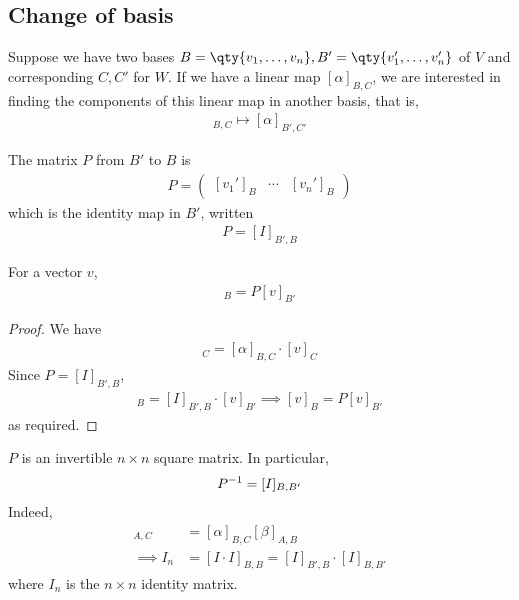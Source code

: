 \subsection{Change of basis}
Suppose we have two bases $B = \qty{v_1, \dots, v_n}, B' = \qty{v_1', \dots, v_n'}$ of $V$ and corresponding $C, C'$ for $W$.
If we have a linear map $[\alpha]_{B,C}$, we are interested in finding the components of this linear map in another basis, that is,
\begin{align*}
    [\alpha]_{B,C} \mapsto [\alpha]_{B',C'}
\end{align*}
\begin{definition}
    The  matrix $P$ from $B'$ to $B$ is
    \begin{align*}
        P = \begin{pmatrix}
            [v_1']_B & \cdots & [v_n']_B
        \end{pmatrix}
    \end{align*}
    which is the identity map in $B'$, written
    \begin{align*}
        P = [I]_{B', B}
    \end{align*}
\end{definition}
\begin{lemma}
    For a vector $v$,
    \begin{align*}
        [v]_B = P [v]_{B'}
    \end{align*}
\end{lemma}
\begin{proof}
    We have
    \begin{align*}
        [\alpha(v)]_C = [\alpha]_{B,C} \cdot [v]_C
    \end{align*}
    Since $P = [I]_{B', B}$,
    \begin{align*}
        [I(v)]_B = [I]_{B', B} \cdot [v]_{B'} \implies [v]_B = P[v]_{B'}
    \end{align*}
    as required.
\end{proof}
\begin{remark}
    $P$ is an invertible $n \times n$ square matrix.
    In particular,
    \begin{align*}
        P^{-1} = [I]_{B,B'}
    \end{align*}
    Indeed,
    \begin{align*}
        [\alpha \circ \beta]_{A, C} &= [\alpha]_{B, C} [\beta]_{A, B} \\
        \implies I_n &= [I \cdot I]_{B,B} = [I]_{B',B} \cdot [I]_{B,B'}
    \end{align*}
    where $I_n$ is the $n \times n$ identity matrix.
\end{remark}

